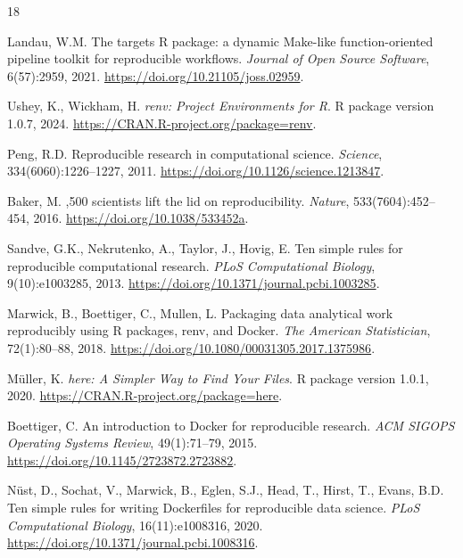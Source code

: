 \documentclass[11pt,twoside,openright]{book}
\begin{document}
\FloatBarrier
\begin{thebibliography}{18}

Landau, W.M.
\newblock The targets {R} package: a dynamic Make-like function-oriented pipeline toolkit for reproducible workflows.
\newblock \emph{Journal of Open Source Software}, 6(57):2959, 2021.
\newblock \url{https://doi.org/10.21105/joss.02959}.

Ushey, K., Wickham, H.
\newblock \emph{renv: Project Environments for R}.
\newblock R package version 1.0.7, 2024.
\newblock \url{https://CRAN.R-project.org/package=renv}.

Peng, R.D.
\newblock Reproducible research in computational science.
\newblock \emph{Science}, 334(6060):1226--1227, 2011.
\newblock \url{https://doi.org/10.1126/science.1213847}.

Baker, M.
,500 scientists lift the lid on reproducibility.
\newblock \emph{Nature}, 533(7604):452--454, 2016.
\newblock \url{https://doi.org/10.1038/533452a}.

Sandve, G.K., Nekrutenko, A., Taylor, J., Hovig, E.
\newblock Ten simple rules for reproducible computational research.
\newblock \emph{PLoS Computational Biology}, 9(10):e1003285, 2013.
\newblock \url{https://doi.org/10.1371/journal.pcbi.1003285}.

Marwick, B., Boettiger, C., Mullen, L.
\newblock Packaging data analytical work reproducibly using {R} packages, renv, and {Docker}.
\newblock \emph{The American Statistician}, 72(1):80--88, 2018.
\newblock \url{https://doi.org/10.1080/00031305.2017.1375986}.

M\"uller, K.
\newblock \emph{here: A Simpler Way to Find Your Files}.
\newblock R package version 1.0.1, 2020.
\newblock \url{https://CRAN.R-project.org/package=here}.

Boettiger, C.
\newblock An introduction to {Docker} for reproducible research.
\newblock \emph{ACM SIGOPS Operating Systems Review}, 49(1):71--79, 2015.
\newblock \url{https://doi.org/10.1145/2723872.2723882}.

N\"ust, D., Sochat, V., Marwick, B., Eglen, S.J., Head, T., Hirst, T., Evans, B.D.
\newblock Ten simple rules for writing {Dockerfiles} for reproducible data science.
\newblock \emph{PLoS Computational Biology}, 16(11):e1008316, 2020.
\newblock \url{https://doi.org/10.1371/journal.pcbi.1008316}.


\end{thebibliography}
\end{document}
